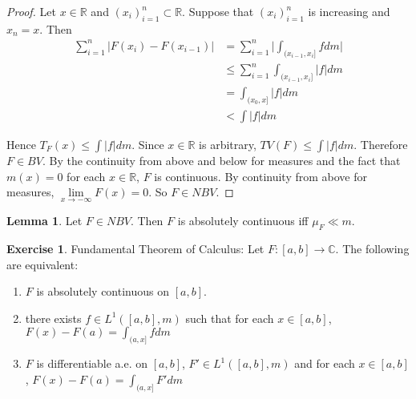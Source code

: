\documentclass[12pt]{amsart}
\theoremstyle{definition}
\newtheorem{lem}[definition]{Lemma}
\newtheorem{ex}[definition]{Exercise}
\newcommand{\C}{\mathbb{C}}
\newcommand{\R}{\mathbb{R}}
\begin{document}
	\begin{proof}
		Let $x \in \R$ and $(x_i)_{i=1}^n \subset \R$. Suppose that $(x_i)_{i=1}^n$ is increasing and $x_n=x$. Then 
		\begin{align*}
			\sum_{i=1}^n|F(x_i)-F(x_{i-1})| 
			&= \sum_{i=1}^n \bigg| \int_{(x_{i-1},x_i]}fdm \bigg|\\
			& \leq \sum_{i=1}^n \int_{(x_{i-1},x_i]}|f|dm \\
			& = \int_{(x_0,x]}|f|dm\\
			& < \int|f|dm
		\end{align*}
		
		Hence $T_F(x) \leq \int |f|dm$. Since $x \in \R$ is arbitrary, $TV(F) \leq \int |f|dm$. Therefore $F \in BV$. By the continuity from above and below for measures and the fact that $m({x})=0$ for each $x \in \R$, $F$ is continuous. By continuity from above for measures, $\lim\limits_{x \rightarrow -\infty} F(x) =0$. So $F \in NBV$.
	\end{proof}
	
	\begin{lem}
		Let $F \in NBV$. Then $F$ is absolutely continuous iff $\mu_F \ll m$.
	\end{lem}
	
	\begin{ex}{Fundamental Theorem of Calculus:}
		Let $F:[a,b] \rightarrow \C$. The following are equivalent:
		\begin{enumerate}
			\item $F$ is absolutely continuous on $[a,b]$.
			\item there exists $f \in L^1([a,b], m)$ such that for each $x \in [a,b]$, $F(x)-F(a)= \int_{(a,x]}fdm$
			\item $F$ is differentiable a.e. on $[a,b]$, $F' \in L^1([a,b], m)$ and for each $x \in [a,b]$, $F(x)-F(a)=\int_{(a,x]}F'dm$
		\end{enumerate}
	\end{ex}
	
\end{document}
